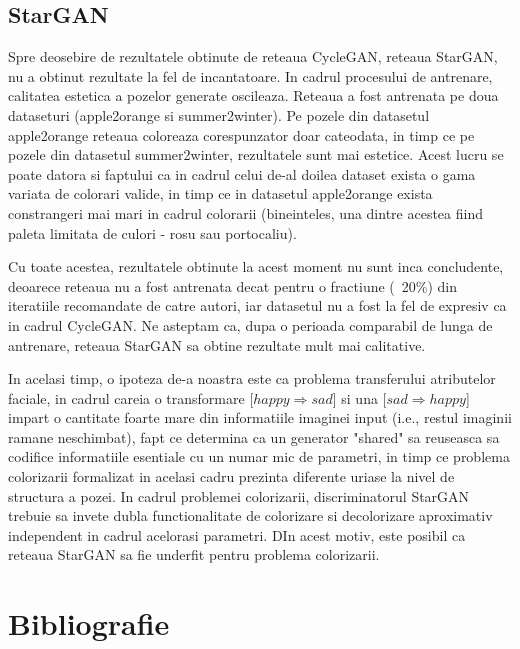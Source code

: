 \documentclass[12pt]{article}
\theoremstyle{definition}
\begin{document}
\subsection{StarGAN}

Spre deosebire de rezultatele obtinute de reteaua CycleGAN, reteaua StarGAN, nu a obtinut rezultate la fel de incantatoare. In cadrul procesului de antrenare, calitatea estetica a pozelor generate oscileaza. Reteaua a fost antrenata pe doua dataseturi (apple2orange si summer2winter). Pe pozele din datasetul apple2orange reteaua coloreaza corespunzator doar cateodata, in timp ce pe pozele din datasetul summer2winter, rezultatele sunt mai estetice. Acest lucru se poate datora si faptului ca in cadrul celui de-al doilea dataset exista o gama variata de colorari valide, in timp ce in datasetul apple2orange exista constrangeri mai mari in cadrul colorarii (bineinteles, una dintre acestea fiind paleta limitata de culori - rosu sau portocaliu).

Cu toate acestea, rezultatele obtinute la acest moment nu sunt inca concludente, deoarece reteaua nu a fost antrenata decat pentru o fractiune (~20\%) din iteratiile recomandate de catre autori, iar datasetul nu a fost la fel de expresiv ca in cadrul CycleGAN. Ne asteptam ca, dupa o perioada comparabil de lunga de antrenare, reteaua StarGAN sa obtine rezultate mult mai calitative.

In acelasi timp, o ipoteza de-a noastra este ca problema transferului atributelor faciale, in cadrul careia o transformare [$happy \Rightarrow sad$] si una [$sad \Rightarrow happy$] impart o cantitate foarte mare din informatiile imaginei input (i.e., restul imaginii ramane neschimbat), fapt ce determina ca un generator "shared" sa reuseasca sa codifice informatiile esentiale cu un numar mic de parametri, in timp ce problema colorizarii formalizat in acelasi cadru prezinta diferente uriase la nivel de structura a pozei. In cadrul problemei colorizarii, discriminatorul StarGAN trebuie sa invete dubla functionalitate de colorizare si decolorizare aproximativ independent in cadrul acelorasi parametri. DIn acest motiv, este posibil ca reteaua StarGAN sa fie underfit pentru problema colorizarii.

\section{Bibliografie}
\end{document}
